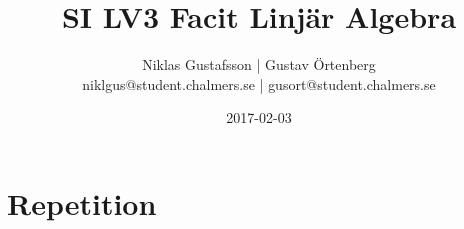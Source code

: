 \documentclass{article}
\title{SI LV3 Facit Linjär Algebra}
\author{Niklas Gustafsson | Gustav Örtenberg  \\ \small{niklgus@student.chalmers.se} | \small{gusort@student.chalmers.se}}
\date{2017-02-03}
\begin{document}
\maketitle
\section*{Repetition}


\section{}


\section{}


\section{}


\section{}


\section{}


\section{}

\end{document}
